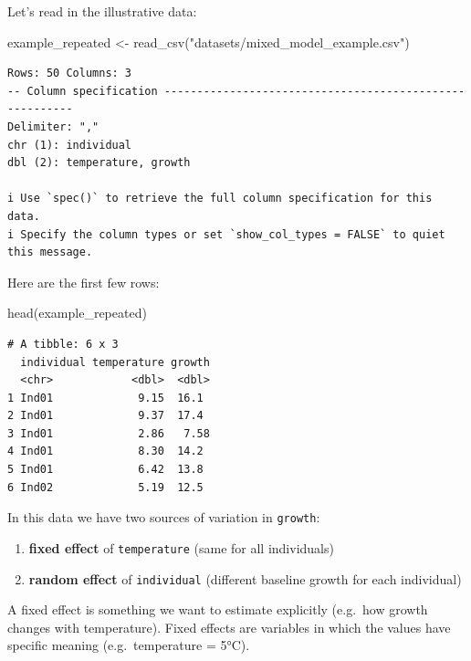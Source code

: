 \documentclass[
  letterpaper,
  8pt,
  a4paper]{book}
\newenvironment{Shaded}{\begin{snugshade}}{\end{snugshade}}
\newcommand{\FunctionTok}[1]{\textcolor[rgb]{0.28,0.35,0.67}{#1}}
\newcommand{\NormalTok}[1]{\textcolor[rgb]{0.00,0.23,0.31}{#1}}
\newcommand{\OtherTok}[1]{\textcolor[rgb]{0.00,0.23,0.31}{#1}}
\newcommand{\StringTok}[1]{\textcolor[rgb]{0.13,0.47,0.30}{#1}}
\providecommand{\tightlist}{%
  \setlength{\itemsep}{0pt}\setlength{\parskip}{0pt}}
\begin{document}
Let's read in the illustrative data:

\begin{Shaded}
\begin{Highlighting}[]
\NormalTok{example\_repeated }\OtherTok{\textless{}{-}} \FunctionTok{read\_csv}\NormalTok{(}\StringTok{"datasets/mixed\_model\_example.csv"}\NormalTok{)}
\end{Highlighting}
\end{Shaded}

\begin{verbatim}
Rows: 50 Columns: 3
-- Column specification --------------------------------------------------------
Delimiter: ","
chr (1): individual
dbl (2): temperature, growth

i Use `spec()` to retrieve the full column specification for this data.
i Specify the column types or set `show_col_types = FALSE` to quiet this message.
\end{verbatim}

Here are the first few rows:

\begin{Shaded}
\begin{Highlighting}[]
\FunctionTok{head}\NormalTok{(example\_repeated)}
\end{Highlighting}
\end{Shaded}

\begin{verbatim}
# A tibble: 6 x 3
  individual temperature growth
  <chr>            <dbl>  <dbl>
1 Ind01             9.15  16.1 
2 Ind01             9.37  17.4 
3 Ind01             2.86   7.58
4 Ind01             8.30  14.2 
5 Ind01             6.42  13.8 
6 Ind02             5.19  12.5 
\end{verbatim}

In this data we have two sources of variation in \texttt{growth}:

\begin{enumerate}
\def\labelenumi{\arabic{enumi}.}
\tightlist
\item
  \textbf{fixed effect} of \texttt{temperature} (same for all
  individuals)
\item
  \textbf{random effect} of \texttt{individual} (different baseline
  growth for each individual)
\end{enumerate}

A fixed effect is something we want to estimate explicitly (e.g.~how
growth changes with temperature). Fixed effects are variables in which
the values have specific meaning (e.g.~temperature = 5°C).
\end{document}
